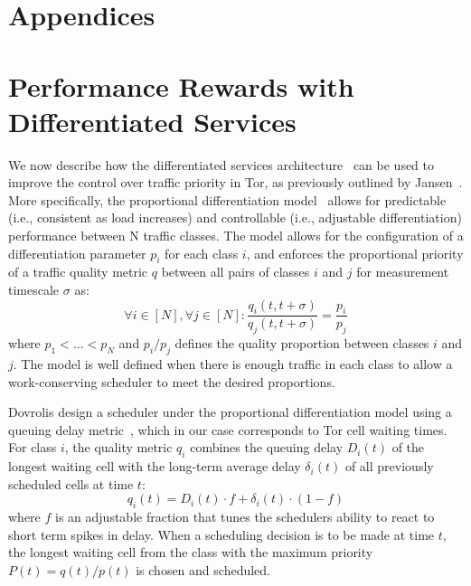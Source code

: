 \appendix
\section*{Appendices}

\section{Performance Rewards with Differentiated Services}

We now describe how the differentiated services
architecture~\cite{blake1998architecture} can be used to improve the control
over traffic priority in Tor, as previously outlined by
Jansen~\cite{jansenphdthesis}. More specifically, the proportional
differentiation model~\cite{dovrolis1999case} allows for predictable (i.e.,
consistent as load increases) and controllable (i.e., adjustable differentiation) performance between N traffic
classes. The model allows for the configuration of a differentiation parameter
$p_i$ for each class $i$, and enforces the proportional priority of a traffic
quality metric $q$ between all pairs of classes $i$ and $j$ for measurement
timescale $\sigma$ as:
\begin{equation}
\forall i \in [N], \forall j \in [N]: \frac{q_i \left( t, t + \sigma \right)}{q_j \left( t, t + \sigma \right)} = \frac{p_i}{p_j}
\end{equation}
where $p_1 < ... < p_N$ and $p_i/p_j$ defines the quality proportion between
classes $i$ and $j$. The model is well defined when there is enough
traffic in each class to allow a work-conserving scheduler to meet the desired
proportions.

Dovrolis \etal design a scheduler under the proportional differentiation model
using a queuing delay metric~\cite{dovrolis2002proportional}, which in our case
corresponds to Tor cell waiting times. For class $i$, the quality metric $q_i$
combines the queuing delay $D_i(t)$ of the longest waiting cell with the
long-term average delay $\delta_i(t)$  of all previously scheduled cells at time $t$:
\begin{equation}
q_i(t) = D_i(t) \cdot f + \delta_i(t) \cdot (1-f)
\end{equation}
where $f$ is an adjustable fraction that tunes the schedulers ability to react
to short term spikes in delay. When a scheduling decision is to be made at time $t$,
the longest waiting cell from the class with the maximum priority
$P(t) = q(t)/p(t)$ is chosen and scheduled.